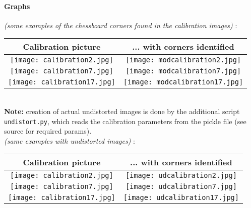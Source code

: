 \documentclass[a4paper]{article}
\begin{document}
\paragraph{Graphs}
\textit{(some examples of the chessboard corners found in the calibration images)}
:\\
\begin{tabular}{ |c|c| }
  \hline
  Calibration picture & ... with corners identified \\
  \hline
  \texttt{[image: calibration2.jpg]} & \texttt{[image: modcalibration2.jpg]} \\
  \hline
  \texttt{[image: calibration7.jpg]} & \texttt{[image: modcalibration7.jpg]} \\
  \hline
  \texttt{[image: calibration17.jpg]} & \texttt{[image: modcalibration17.jpg]} \\
  \hline
\end{tabular}
\\
\textbf{Note:} creation of actual undistorted images is done by the additional script
\texttt{undistort.py}, which reads the calibration parameters from the pickle file
(see source for required params).
\\

\textit{(same examples with undistorted images)}
:\\
\begin{tabular}{ |c|c| }
  \hline
  Calibration picture & ... with corners identified \\
  \hline
  \texttt{[image: calibration2.jpg]} & \texttt{[image: udcalibration2.jpg]} \\
  \hline
  \texttt{[image: calibration7.jpg]} & \texttt{[image: udcalibration7.jpg]} \\
  \hline
  \texttt{[image: calibration17.jpg]} & \texttt{[image: udcalibration17.jpg]} \\
  \hline
\end{tabular}
\end{document}
